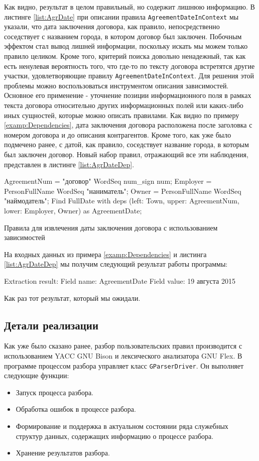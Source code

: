 Как видно, результат в целом правильный, но содержит лишнюю информацию. В листинге \ref{list:AgrDate} при описании правила \lstinline{AgreementDateInContext} мы указали, что дата заключения договора, как правило, непосредственно соседствует с названием города, в котором договор был заключен. Побочным эффектом стал вывод лишней информации, поскольку искать мы можем только правило целиком. Кроме того, критерий поиска довольно ненадежный, так как есть ненулевая вероятность того, что где-то по тексту договора встретятся другие участки, удовлетворяющие правилу \lstinline{AgreementDateInContext}. Для решения этой проблемы можно воспользоваться инструментом описания зависимостей. Основное его применение - уточнение позиции информационного поля в рамках текста договора относительно других информационных полей или каких-либо иных сущностей, которые можно описать правилами. Как видно по примеру \ref{examp:Dependencies}, дата заключения договора расположена после заголовка с номером договора и до описания контрагентов. Кроме того, как уже было подмечено ранее, с датой, как правило, соседствует название города, в которым был заключен договор. Новый набор правил, отражающий все эти наблюдения, представлен в листинге \ref{list:AgrDateDep}.
\begin{ListingEnv}
\begin{Verb}
AgreementNum = "договор" WordSeq num_sign num;
Employer = PersonFullName WordSeq "наниматель";
Owner = PersonFullName WordSeq "наймодатель";
Find FullDate 
with deps (left: Town, 
           upper: AgreementNum, 
           lower: Employer, Owner)
as AgreementDate;
\end{Verb}
\caption{Правила для извлечения даты заключения договора с использованием зависимостей}
\label{list:AgrDateDep}
\end{ListingEnv}
На входных данных из примера \ref{examp:Dependencies} и листинга \ref{list:AgrDateDep} мы получим следующий результат работы программы:
\begin{Verb}
Extraction result:
Field name: AgreementDate
Field value: 19 августа 2015
\end{Verb}
Как раз тот результат, который мы ожидали.

\subsection{Детали реализации}
Как уже было сказано ранее, разбор пользовательских правил производится с использованием YACC GNU Bison и лексического анализатора GNU Flex. В программе процессом разбора управляет класс \lstinline{GParserDriver}. Он выполняет следующие функции:
\begin{itemize}
  \item Запуск процесса разбора.
  \item Обработка ошибок в процессе разбора.
  \item Формирование и поддержка в актуальном состоянии ряда служебных структур данных, содержащих информацию о процессе разбора.
  \item Хранение результатов разбора.
\end{itemize}

